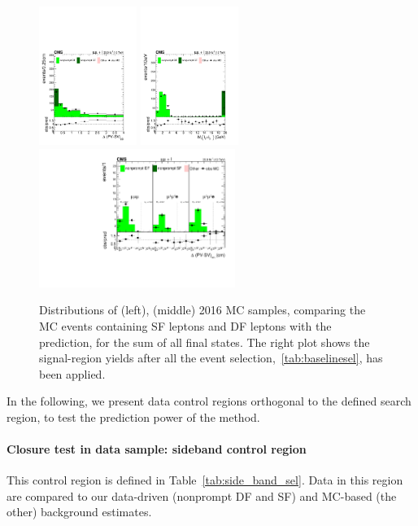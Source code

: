 \begin{figure}[h!]
  \centering
  \includegraphics[clip,trim=0.cm 0.cm 0.5cm 0.5cm,height=4.5cm]{Figures/c6/backgrounds/mc_closure/mu_DeltaPV_SV_2D_zomm__0.pdf}
  \includegraphics[clip,trim=0.cm 0.cm 0.5cm 0.5cm,height=4.5cm]{Figures/c6/backgrounds/mc_closure/mu_M_ll_l2_l3_zoom__0.pdf}
  \includegraphics[clip,trim=0.5cm 0.cm 0.5cm 0.5cm,height=4.5cm]{Figures/c6/backgrounds/mc_closure/mu_SR__final.pdf}
  \caption{Distributions of \Deltwod (left), \mtwol (middle)
    2016 \ttbar MC samples,
    comparing the MC events containing SF leptons
    and DF leptons with the
    prediction, for the sum of all final states.
    The right plot shows the signal-region yields after all the event
    selection,~\ref{tab:baselinesel}, has been applied.}
  \label{fig:mcClosure}
\end{figure}


In the following, we present data control regions orthogonal to the
defined search region, to test the prediction power of the method.


 \paragraph{Closure test in data sample: sideband control region}\label{sec:llsidebandcr}
This control region is defined in Table~\ref{tab:side_band_sel}.
Data in this region are compared to our data-driven (nonprompt DF and
SF) and MC-based (the other) background estimates.

